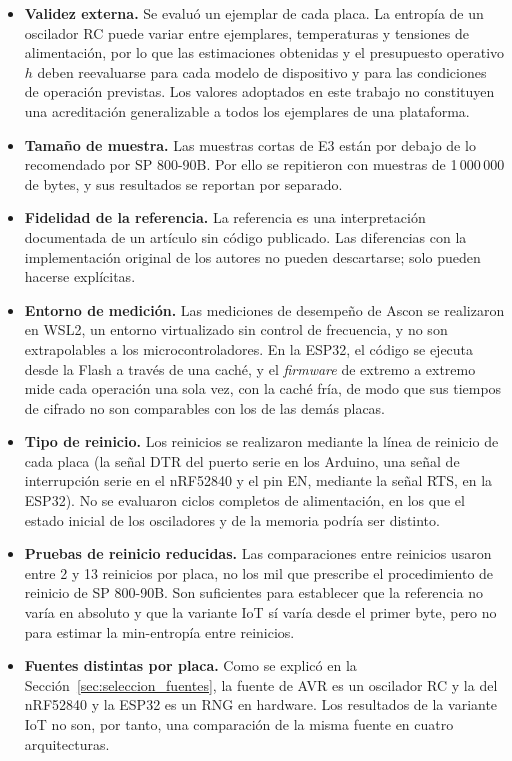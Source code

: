 \begin{itemize}
    \item \textbf{Validez externa.} Se evaluó un ejemplar de cada placa. La entropía de un oscilador RC puede variar entre ejemplares, temperaturas y tensiones de alimentación, por lo que las estimaciones obtenidas y el presupuesto operativo $h$ deben reevaluarse para cada modelo de dispositivo y para las condiciones de operación previstas. Los valores adoptados en este trabajo no constituyen una acreditación generalizable a todos los ejemplares de una plataforma.
    \item \textbf{Tamaño de muestra.} Las muestras cortas de E3 están por debajo de lo recomendado por SP 800-90B. Por ello se repitieron con muestras de 1\,000\,000 de bytes, y sus resultados se reportan por separado.
    \item \textbf{Fidelidad de la referencia.} La referencia es una interpretación documentada de un artículo sin código publicado. Las diferencias con la implementación original de los autores no pueden descartarse; solo pueden hacerse explícitas.
    \item \textbf{Entorno de medición.} Las mediciones de desempeño de Ascon se realizaron en WSL2, un entorno virtualizado sin control de frecuencia, y no son extrapolables a los microcontroladores. En la ESP32, el código se ejecuta desde la Flash a través de una caché, y el \textit{firmware} de extremo a extremo mide cada operación una sola vez, con la caché fría, de modo que sus tiempos de cifrado no son comparables con los de las demás placas.
    \item \textbf{Tipo de reinicio.} Los reinicios se realizaron mediante la línea de reinicio de cada placa (la señal DTR del puerto serie en los Arduino, una señal de interrupción serie en el nRF52840 y el pin EN, mediante la señal RTS, en la ESP32). No se evaluaron ciclos completos de alimentación, en los que el estado inicial de los osciladores y de la memoria podría ser distinto.
    \item \textbf{Pruebas de reinicio reducidas.} Las comparaciones entre reinicios usaron entre 2 y 13 reinicios por placa, no los mil que prescribe el procedimiento de reinicio de SP 800-90B. Son suficientes para establecer que la referencia no varía en absoluto y que la variante IoT sí varía desde el primer byte, pero no para estimar la min-entropía entre reinicios.
    \item \textbf{Fuentes distintas por placa.} Como se explicó en la Sección~\ref{sec:seleccion_fuentes}, la fuente de AVR es un oscilador RC y la del nRF52840 y la ESP32 es un RNG en hardware. Los resultados de la variante IoT no son, por tanto, una comparación de la misma fuente en cuatro arquitecturas.

\end{itemize}
